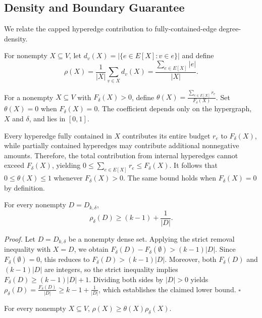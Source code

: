 \documentclass[twocolumn]{svjour3}
\begin{document}
\subsection{Density and Boundary Guarantee}
We relate the capped hyperedge contribution to fully-contained-edge degree-density. %

\begin{definition}\label{adensity}
For nonempty $X\subseteq V$, let $d_v(X)=|\{e\in E[X]:v\in e\}|$ and define
\[
 \rho(X)=\frac{1}{|X|}\sum_{v\in X}d_v(X)
        =\frac{\sum_{e\in E[X]}|e|}{|X|}.
\]
\end{definition}

\begin{definition}\label{def:theta}
For a nonempty $X\subseteq V$ with $F_\delta(X)>0$, define
$\theta(X)=\frac{\sum_{e\in E[X]}r_e}{F_\delta(X)}$.
Set $\theta(X)=0$ when $F_\delta(X)=0$. The coefficient depends only on the hypergraph, $X$ and $\delta$, and lies in $[0,1]$.
\end{definition}

Every hyperedge fully contained in $X$ contributes its entire budget $r_e$ to $F_\delta(X)$, while partially contained hyperedges may contribute additional nonnegative amounts. Therefore, the total contribution from internal hyperedges cannot exceed $F_\delta(X)$, yielding
$0\le \sum_{e\in E[X]}r_e\le F_\delta(X)$.
It follows that $0\le\theta(X)\le1$ whenever $F_\delta(X)>0$. The same bound holds when $F_\delta(X)=0$ by definition.

\begin{lemma}\label{lem:headfloor-Dk}
For every nonempty $D=D_{k,\delta}$,
\[
 \rho_\delta(D)\ge(k-1)+\frac{1}{|D|}.
\]
\end{lemma}
\emph{Proof.}
Let $D=D_{k,\delta}$ be a nonempty dense set.
Applying the strict removal inequality with $X=D$, we obtain
$F_\delta(D)-F_\delta(\emptyset)>(k-1)|D|$.
Since $F_\delta(\emptyset)=0$, this reduces to
$F_\delta(D)>(k-1)|D|$.
Moreover, both $F_\delta(D)$ and $(k-1)|D|$ are integers,
so the strict inequality implies
$F_\delta(D)\ge (k-1)|D|+1$.
Dividing both sides by $|D|>0$ yields
$\rho_\delta(D)=\frac{F_\delta(D)}{|D|}
\ge k-1+\frac{1}{|D|}$,
which establishes the claimed lower bound.
\hfill$\square$

\begin{lemma}\label{lem:bridge-strong}
For every nonempty $X\subseteq V$, $\rho(X)\ge\theta(X)\rho_\delta(X)$.
\end{lemma}
\end{document}
